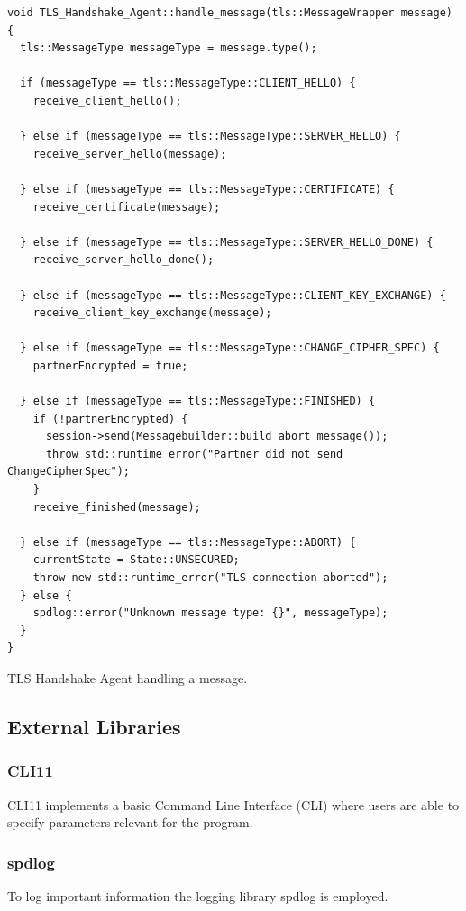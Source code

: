 \documentclass[12pt, letterpaper]{article}
\newenvironment{code}{\captionsetup{type=listing}}{}
\begin{document}
\begin{code}
	\begin{verbatim}
void TLS_Handshake_Agent::handle_message(tls::MessageWrapper message) {    
  tls::MessageType messageType = message.type();
	
  if (messageType == tls::MessageType::CLIENT_HELLO) {
    receive_client_hello();
    
  } else if (messageType == tls::MessageType::SERVER_HELLO) {
    receive_server_hello(message);
		
  } else if (messageType == tls::MessageType::CERTIFICATE) {
    receive_certificate(message);
		
  } else if (messageType == tls::MessageType::SERVER_HELLO_DONE) {
    receive_server_hello_done();
		
  } else if (messageType == tls::MessageType::CLIENT_KEY_EXCHANGE) {
    receive_client_key_exchange(message);
	
  } else if (messageType == tls::MessageType::CHANGE_CIPHER_SPEC) {
    partnerEncrypted = true;
		
  } else if (messageType == tls::MessageType::FINISHED) {
    if (!partnerEncrypted) {
      session->send(Messagebuilder::build_abort_message());
      throw std::runtime_error("Partner did not send ChangeCipherSpec");
    }
    receive_finished(message);
		
  } else if (messageType == tls::MessageType::ABORT) {
    currentState = State::UNSECURED;
    throw new std::runtime_error("TLS connection aborted");
  } else {
    spdlog::error("Unknown message type: {}", messageType);
  }
}
	\end{verbatim}
	\caption{TLS Handshake Agent handling a message.}
	\label{messageHandling}
\end{code}


\subsection{External Libraries}
\label{extBib}

\subsubsection{CLI11}
CLI11 \cite{cli11_ref} implements a basic Command Line Interface (CLI) where users are able to specify parameters relevant for the program. 


\subsubsection{spdlog}
To log important information the logging library spdlog \cite{spdlog_ref} is employed.
\end{document}

